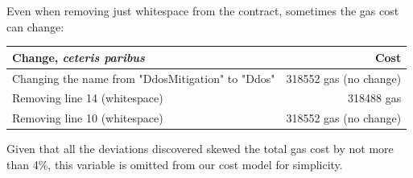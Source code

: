 Even when removing just whitespace from the contract, sometimes the gas cost can change:

\begin{center}
  \begin{tabular}{ l | r }
    \hline
    \textbf{Change, \textit{ceteris paribus}} & \textbf{Cost} \\ \hline
    Changing the name from "DdosMitigation" to "Ddos" & 318552 gas (no change) \\ \hline
    Removing line 14 (whitespace) & 318488 gas \\ \hline
    Removing line 10 (whitespace) & 318552 gas (no change) \\
    \hline
  \end{tabular}
\end{center}

Given that all the deviations discovered skewed the total gas cost by not more than 4\%, this variable is omitted from our cost model for simplicity.
